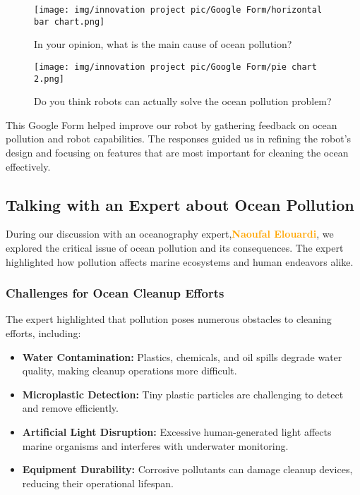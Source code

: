 \begin{figure}[h!]
    \centering
    \begin{minipage}{0.45\textwidth}
        \centering
        \texttt{[image: img/innovation project pic/Google Form/horizontal bar chart.png]}
        \caption{In your opinion, what is the main cause of ocean pollution?}
    \end{minipage}
    \hfill
    \begin{minipage}{0.45\textwidth}
        \centering
        \texttt{[image: img/innovation project pic/Google Form/pie chart 2.png]}
        \caption{Do you think robots can actually solve the ocean pollution problem?}
    \end{minipage}
    
    \vspace{1cm} %

\end{figure}
 \vspace{3cm}
This Google Form helped improve our robot by gathering feedback on ocean pollution and robot capabilities. The responses guided us in refining the robot's design and focusing on features that are most important for cleaning the ocean effectively.



\subsection{Talking with an Expert about Ocean Pollution}
During our discussion with an oceanography expert,\textbf{\textcolor{orange}{Naoufal Elouardi}}, we explored the critical issue of ocean pollution and its consequences. The expert highlighted how pollution affects marine ecosystems and human endeavors alike.

\subsubsection{Challenges for Ocean Cleanup Efforts}
The expert highlighted that pollution poses numerous obstacles to cleaning efforts, including:

\begin{itemize}
    \item \textbf{Water Contamination:} Plastics, chemicals, and oil spills degrade water quality, making cleanup operations more difficult.
    \item \textbf{Microplastic Detection:} Tiny plastic particles are challenging to detect and remove efficiently.
    \item \textbf{Artificial Light Disruption:} Excessive human-generated light affects marine organisms and interferes with underwater monitoring.
    \item \textbf{Equipment Durability:} Corrosive pollutants can damage cleanup devices, reducing their operational lifespan.
\end{itemize}

